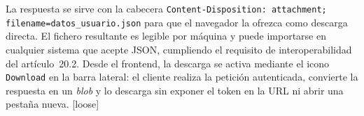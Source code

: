 La respuesta se sirve con la cabecera \texttt{Content-Disposition: attachment; filename=\textquotedbl{}datos\_usuario.json\textquotedbl{}} para que el navegador la ofrezca como descarga directa. El fichero resultante es legible por máquina y puede importarse en cualquier sistema que acepte JSON, cumpliendo el requisito de interoperabilidad del artículo~20.2. Desde el frontend, la descarga se activa mediante el icono \texttt{Download} en la barra lateral: el cliente realiza la petición autenticada, convierte la respuesta en un \emph{blob} y lo descarga sin exponer el token en la URL ni abrir una pestaña nueva.
[loose]
